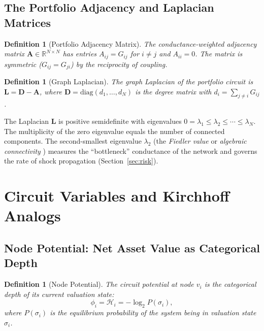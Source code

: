 \documentclass[twocolumn,10pt]{article}
\newtheorem{definition}[theorem]{Definition}
\theoremstyle{remark}
\newcommand{\secref}[1]{Section~\ref{#1}}
\begin{document}
\subsection{The Portfolio Adjacency and Laplacian Matrices}

\begin{definition}[Portfolio Adjacency Matrix]
\label{def:adjacency}
The \emph{conductance-weighted adjacency matrix} $\mathbf{A} \in \mathbb{R}^{N \times N}$ has entries $A_{ij} = G_{ij}$ for $i \neq j$ and $A_{ii} = 0$.  The matrix is symmetric ($G_{ij} = G_{ji}$) by the reciprocity of coupling.
\end{definition}

\begin{definition}[Graph Laplacian]
\label{def:laplacian}
The \emph{graph Laplacian} of the portfolio circuit is $\mathbf{L} = \mathbf{D} - \mathbf{A}$, where $\mathbf{D} = \text{diag}(d_1, \ldots, d_N)$ is the degree matrix with $d_i = \sum_{j \neq i} G_{ij}$.
\end{definition}

The Laplacian $\mathbf{L}$ is positive semidefinite with eigenvalues $0 = \lambda_1 \leq \lambda_2 \leq \cdots \leq \lambda_N$.  The multiplicity of the zero eigenvalue equals the number of connected components.  The second-smallest eigenvalue $\lambda_2$ (the \emph{Fiedler value} or \emph{algebraic connectivity} \cite{fiedler1973}) measures the ``bottleneck'' conductance of the network and governs the rate of shock propagation (\secref{sec:risk}).


\section{Circuit Variables and Kirchhoff Analogs}
\label{sec:kirchhoff}

\subsection{Node Potential: Net Asset Value as Categorical Depth}

\begin{definition}[Node Potential]
\label{def:node_potential}
The \emph{circuit potential} at node $v_i$ is the categorical depth of its current valuation state:
\begin{equation}
    \phi_i = \mathcal{H}_i = -\log_2 P(\sigma_i),
    \label{eq:node_potential}
\end{equation}
where $P(\sigma_i)$ is the equilibrium probability of the system being in valuation state $\sigma_i$.
\end{definition}
\end{document}
